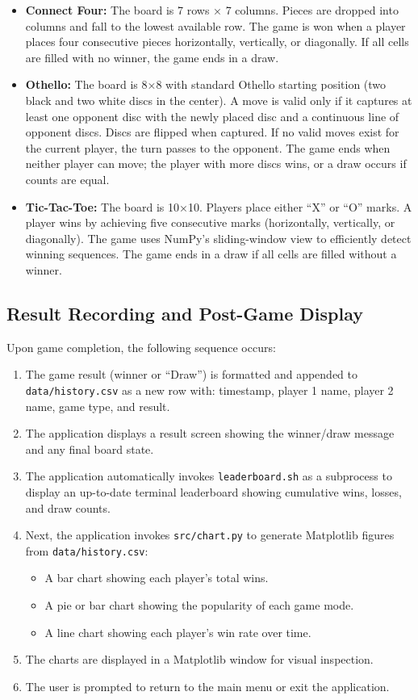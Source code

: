 \documentclass[12pt,a4paper]{article}
\begin{document}
\begin{itemize}
    \item \textbf{Connect Four:} The board is 7 rows × 7 columns. Pieces are dropped into columns and fall to the lowest available row. The game is won when a player places four consecutive pieces horizontally, vertically, or diagonally. If all cells are filled with no winner, the game ends in a draw.
    \item \textbf{Othello:} The board is 8×8 with standard Othello starting position (two black and two white discs in the center). A move is valid only if it captures at least one opponent disc with the newly placed disc and a continuous line of opponent discs. Discs are flipped when captured. If no valid moves exist for the current player, the turn passes to the opponent. The game ends when neither player can move; the player with more discs wins, or a draw occurs if counts are equal.
    \item \textbf{Tic-Tac-Toe:} The board is 10×10. Players place either ``X'' or ``O'' marks. A player wins by achieving five consecutive marks (horizontally, vertically, or diagonally). The game uses NumPy's sliding-window view to efficiently detect winning sequences. The game ends in a draw if all cells are filled without a winner.
\end{itemize}

\subsection{Result Recording and Post-Game Display}

Upon game completion, the following sequence occurs:

\begin{enumerate}
    \item The game result (winner or ``Draw'') is formatted and appended to \texttt{data/history.csv} as a new row with: timestamp, player 1 name, player 2 name, game type, and result.
    \item The application displays a result screen showing the winner/draw message and any final board state.
    \item The application automatically invokes \texttt{leaderboard.sh} as a subprocess to display an up-to-date terminal leaderboard showing cumulative wins, losses, and draw counts.
    \item Next, the application invokes \texttt{src/chart.py} to generate Matplotlib figures from \texttt{data/history.csv}:
    \begin{itemize}
        \item A bar chart showing each player's total wins.
        \item A pie or bar chart showing the popularity of each game mode.
        \item A line chart showing each player's win rate over time.
    \end{itemize}
    \item The charts are displayed in a Matplotlib window for visual inspection.
    \item The user is prompted to return to the main menu or exit the application.
\end{enumerate}
\end{document}
